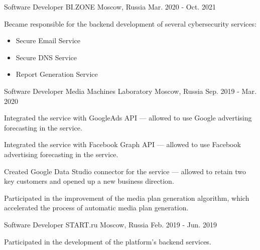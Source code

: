 \begin{cventries}
  \cventry
    {Software Developer} %
    {BI.ZONE} %
    {Moscow, Russia} %
    {Mar. 2020 - Oct. 2021} %
    {
      \begin{cvitems} %
        \item {Became responsible for the backend development of several cybersecurity services:}
        \begin{itemize}
          \item {Secure Email Service}
          \item {Secure DNS Service}
          \item {Report Generation Service}
        \end{itemize}
      \end{cvitems}
    }

  \cventry
    {Software Developer} %
    {Media Machines Laboratory} %
    {Moscow, Russia} %
    {Sep. 2019 - Mar. 2020} %
    {
      \begin{cvitems} %
        \item {Integrated the service with GoogleAds API — allowed to use Google advertising forecasting in the service.}
        \item {Integrated the service with Facebook Graph API — allowed to use Facebook advertising forecasting in the service.}
        \item {Created Google Data Studio connector for the service — allowed to retain two key customers and opened up a new business direction.}
        \item {Participated in the improvement of the media plan generation algorithm, which accelerated the process of automatic media plan generation.}
      \end{cvitems}
    }

  \cventry
    {Software Developer} %
    {START.ru} %
    {Moscow, Russia} %
    {Feb. 2019 - Jun. 2019} %
    {
      \begin{cvitems} %
        \item {Participated in the development of the platform's backend services.}
      \end{cvitems}
    }


\end{cventries}
